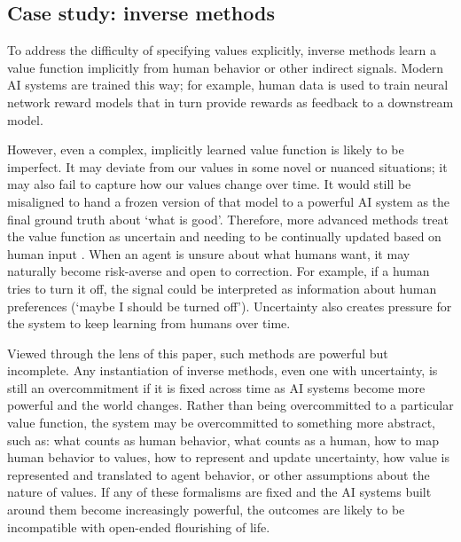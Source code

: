 \documentclass[11pt]{article}
\begin{document}
\subsection{Case study: inverse methods}

To address the difficulty of specifying values explicitly, inverse methods learn a value function implicitly from human behavior or other indirect signals. Modern AI systems are trained this way; for example, human data is used to train neural network reward models that in turn provide rewards as feedback to a downstream model.

However, even a complex, implicitly learned value function is likely to be imperfect. It may deviate from our values in some novel or nuanced situations; it may also fail to capture how our values change over time. It would still be misaligned to hand a frozen version of that model to a powerful AI system as the final ground truth about `what is good'. Therefore, more advanced methods treat the value function as uncertain and needing to be continually updated based on human input \citep{russell2019human, hadfieldmenell2017off, hadfieldmenell2016cooperative, shah2020benefits, jeon2020reward}. When an agent is unsure about what humans want, it may naturally become risk-averse and open to correction. For example, if a human tries to turn it off, the signal could be interpreted as information about human preferences (`maybe I should be turned off'). Uncertainty also creates pressure for the system to keep learning from humans over time.

Viewed through the lens of this paper, such methods are powerful but incomplete. Any instantiation of inverse methods, even one with uncertainty, is still an overcommitment if it is fixed across time as AI systems become more powerful and the world changes. Rather than being overcommitted to a particular value function, the system may be overcommitted to something more abstract, such as: what counts as human behavior, what counts as a human, how to map human behavior to values, how to represent and update uncertainty, how value is represented and translated to agent behavior, or other assumptions about the nature of values. If any of these formalisms are fixed and the AI systems built around them become increasingly powerful, the outcomes are likely to be incompatible with open-ended flourishing of life.

\end{document}
